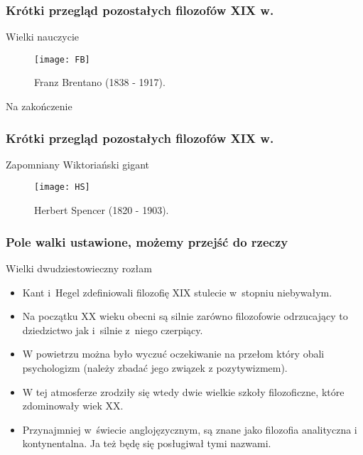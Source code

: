 \begin{frame}
\frametitle{Krótki przegląd pozostałych filozofów XIX w.}
\begin{block}{Wielki nauczycie}
\begin{figure}
\centering
\texttt{[image: FB]}
\caption{Franz Brentano (1838 - 1917).}
\end{figure}
\end{block}
\end{frame}

\begin{frame}{Na zakończenie}
\frametitle{Krótki przegląd pozostałych filozofów XIX w.}
\begin{block}{Zapomniany Wiktoriański gigant}
\begin{figure}
\centering
\texttt{[image: HS]}
\caption{Herbert Spencer (1820 - 1903).}
\end{figure}
\end{block}
\end{frame}


\begin{frame}
\frametitle{Pole walki ustawione, możemy przejść do rzeczy}
\begin{block}{Wielki dwudziestowieczny rozłam}
\begin{itemize}
\item Kant i~Hegel zdefiniowali filozofię XIX stulecie w~stopniu niebywałym.
\item Na początku XX wieku obecni są silnie zarówno filozofowie odrzucający to dziedzictwo jak i~silnie z~niego czerpiący.
\item W powietrzu można było wyczuć oczekiwanie na przełom który obali psychologizm (należy zbadać jego związek z pozytywizmem).
\item W tej atmosferze zrodziły się wtedy dwie wielkie szkoły filozoficzne, które zdominowały wiek XX.
\item Przynajmniej w~świecie anglojęzycznym, są znane jako filozofia analityczna i kontynentalna. Ja też będę się posługiwał tymi nazwami.
\end{itemize}
\end{block}
\end{frame}

